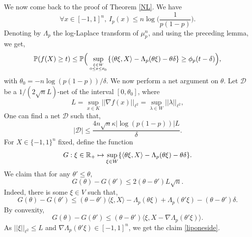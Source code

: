 \documentclass[a4paper,oneside,11pt]{article}
\begin{document}
We now come back to the proof of Theorem \ref{NL}.   We have
$$ \forall  x \in [-1,1]^n, \ I_p(x) \leq n \log\Big(\frac{1}{p(1-p)}\Big).$$
Denoting by $\Lambda_p$ the log-Laplace transform of $\mu_p^n$, and using the preceding lemma, we get,
$$\mathbb{P}(f(X) \geq t) \leq \mathbb{P}\Big( \sup_{\xi \in W \atop 0\leq \theta \leq \theta_0} \{ \langle \theta \xi, X\rangle - \Lambda_{p}(\theta \xi) - \theta \delta\} \geq \phi_p(t-\delta)\Big),$$
with $\theta_0 = -n \log(p(1-p))/\delta$.
We now perform a net argument on $\theta$. Let $\mathcal{D}$ be a $1/(2\sqrt{n}L)$-net of the interval $[0,\theta_0]$, where 
$$ L = \sup_{ x\in K} ||\nabla f (x) ||_{\ell^2} = \sup_{ \lambda \in W} ||\lambda ||_{\ell^2},$$
One can find a net $\mathcal{D}$ such that,
$$ |\mathcal{D}| \leq \frac{4 n\sqrt{n} \kappa |\log(p(1-p))|L }{\delta}.$$
 For $X\in \{-1,1\}^n$ fixed, define the function 
$$G : \xi \in \mathbb{R}_+  \mapsto \sup_{\xi \in W} \{ \langle \theta\xi, X\rangle - \Lambda_p(\theta \xi) - \theta \delta\}.$$
We claim that for any $\theta' \leq \theta$,
\begin{equation} \label{liponeside} G(\theta) - G(\theta') \leq 2(\theta -\theta')L\sqrt{n}.\end{equation}
Indeed, there is some $\xi \in V$ such that,
$$ G(\theta) -G(\theta') \leq (\theta-\theta')\langle \xi, X\rangle   -\Lambda_p(\theta \xi) + \Lambda_p(\theta'\xi) - (\theta-\theta')\delta.$$
By convexity,
$$ G(\theta) -G(\theta') \leq (\theta-\theta')\langle \xi, X - \nabla \Lambda_p(\theta' \xi) \rangle.$$
As $|| \xi||_{\ell^2} \leq L$ and $\nabla \Lambda_p(\theta' \xi) \in [-1,1]^n$, we get the claim \eqref{liponeside}.
\end{document}
